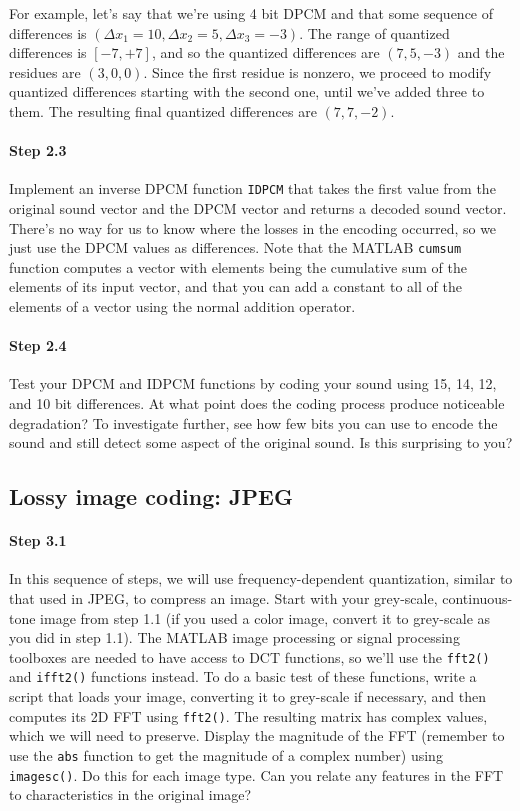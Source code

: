 For example, let's say that we're using 4 bit DPCM and that some
sequence of differences is $(\Delta x_1=10, \Delta x_2=5, \Delta
x_3=-3)$. The range of quantized differences is $[-7, +7]$, and so the
quantized differences are $(7, 5, -3)$ and the residues are $(3, 0,
0)$. Since the first residue is nonzero, we proceed to modify quantized
differences starting with the second one, until we've added three to
them. The resulting final quantized differences are $(7, 7, -2)$.

\paragraph{Step 2.3} Implement an inverse DPCM function \verb|IDPCM|
that takes the first value from the original sound vector and the DPCM
vector and returns a decoded sound vector. There's no way for us to
know where the losses in the encoding occurred, so we just use the
DPCM values as differences. Note that the MATLAB \verb|cumsum|
function computes a vector with elements being the cumulative sum of
the elements of its input vector, and that you can add a constant to
all of the elements of a vector using the normal addition operator.

\paragraph{Step 2.4} Test your DPCM and IDPCM functions by coding your
sound using 15, 14, 12, and 10 bit differences. At what point does the
coding process produce noticeable degradation? To investigate further,
see how few bits you can use to encode the sound and still detect some
aspect of the original sound. Is this surprising to you?

\subsection{Lossy image coding: JPEG}

\paragraph{Step 3.1} In this sequence of steps, we will use
frequency-dependent quantization, similar to that used in JPEG, to
compress an image. Start with your grey-scale, continuous-tone image
from step 1.1 (if you used a color image, convert it to grey-scale as
you did in step 1.1). The MATLAB image processing or signal processing
toolboxes are needed to have access to DCT functions, so we'll use the
\verb|fft2()| and \verb|ifft2()| functions instead. To do a basic test
of these functions, write a script that loads your image, converting
it to grey-scale if necessary, and then computes its 2D FFT using
\verb|fft2()|. The resulting matrix has complex values, which we will
need to preserve. Display the magnitude of the FFT (remember to use
the \verb|abs| function to get the magnitude of a complex number)
using \verb|imagesc()|. Do this for each image type.  Can you relate
any features in the FFT to characteristics in the original image?

